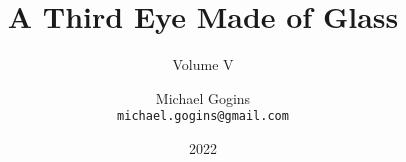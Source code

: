 

\title{A Third Eye Made of Glass}
\subtitle{Volume V}
\author{Michael Gogins \\ \texttt{michael.gogins@gmail.com}}
\date{2022 }
\publishers{Irreducible Productions, New York}

\maketitle
	





